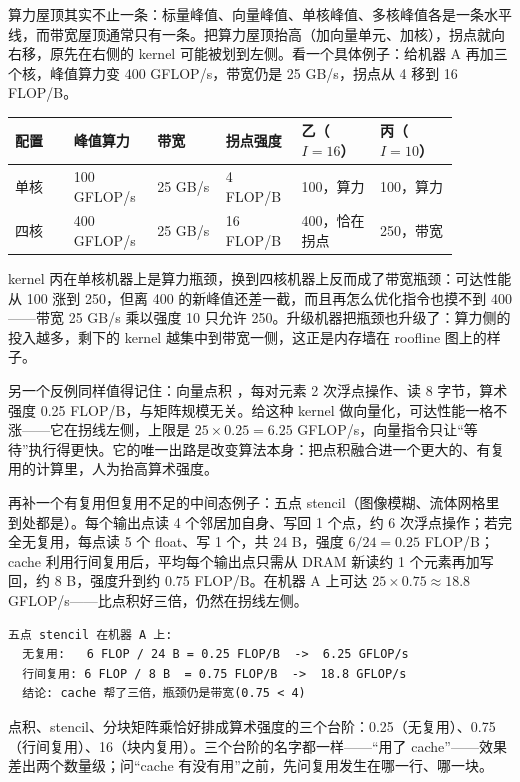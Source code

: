 算力屋顶其实不止一条：标量峰值、向量峰值、单核峰值、多核峰值各是一条水平线，而带宽屋顶通常只有一条。把算力屋顶抬高（加向量单元、加核），拐点就向右移，原先在右侧的 kernel 可能被划到左侧。看一个具体例子：给机器 A 再加三个核，峰值算力变 400 GFLOP/s，带宽仍是 25 GB/s，拐点从 4 移到 16 FLOP/B。

\begin{longtable}{L{0.12\linewidth}L{0.16\linewidth}L{0.14\linewidth}L{0.14\linewidth}L{0.16\linewidth}L{0.16\linewidth}}
\toprule
配置 & 峰值算力 & 带宽 & 拐点强度 & 乙（$I=16$） & 丙（$I=10$） \\
\midrule
单核 & 100 GFLOP/s & 25 GB/s & 4 FLOP/B & 100，算力 & 100，算力 \\\tablerowrule
四核 & 400 GFLOP/s & 25 GB/s & 16 FLOP/B & 400，恰在拐点 & 250，带宽 \\
\bottomrule
\end{longtable}

kernel 丙在单核机器上是算力瓶颈，换到四核机器上反而成了带宽瓶颈：可达性能从 100 涨到 250，但离 400 的新峰值还差一截，而且再怎么优化指令也摸不到 400——带宽 25 GB/s 乘以强度 10 只允许 250。升级机器把瓶颈也升级了：算力侧的投入越多，剩下的 kernel 越集中到带宽一侧，这正是内存墙在 roofline 图上的样子。

另一个反例同样值得记住：向量点积 ，每对元素 2 次浮点操作、读 8 字节，算术强度 0.25 FLOP/B，与矩阵规模无关。给这种 kernel 做向量化，可达性能一格不涨——它在拐线左侧，上限是 $25\times0.25=6.25$ GFLOP/s，向量指令只让“等待”执行得更快。它的唯一出路是改变算法本身：把点积融合进一个更大的、有复用的计算里，人为抬高算术强度。

再补一个有复用但复用不足的中间态例子：五点 stencil（图像模糊、流体网格里到处都是）。每个输出点读 4 个邻居加自身、写回 1 个点，约 6 次浮点操作；若完全无复用，每点读 5 个 float、写 1 个，共 24 B，强度 $6/24=0.25$ FLOP/B；cache 利用行间复用后，平均每个输出点只需从 DRAM 新读约 1 个元素再加写回，约 8 B，强度升到约 0.75 FLOP/B。在机器 A 上可达 $25\times0.75\approx18.8$ GFLOP/s——比点积好三倍，仍然在拐线左侧。

\begin{lstlisting}
五点 stencil 在机器 A 上:
  无复用:   6 FLOP / 24 B = 0.25 FLOP/B  ->  6.25 GFLOP/s
  行间复用: 6 FLOP / 8 B  = 0.75 FLOP/B  ->  18.8 GFLOP/s
  结论: cache 帮了三倍，瓶颈仍是带宽(0.75 < 4)
\end{lstlisting}

点积、stencil、分块矩阵乘恰好排成算术强度的三个台阶：0.25（无复用）、0.75（行间复用）、16（块内复用）。三个台阶的名字都一样——“用了 cache”——效果差出两个数量级；问“cache 有没有用”之前，先问复用发生在哪一行、哪一块。

